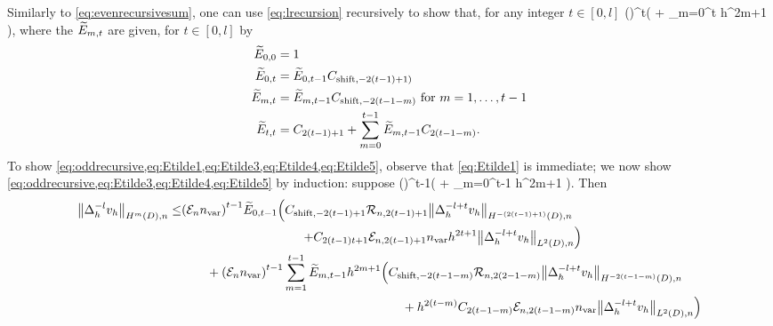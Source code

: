 Similarly to \cref{eq:evenrecursivesum}, one can use \cref{eq:lrecursion} recursively to show that, for any integer $t \in [0,l]$
\beq\label{eq:oddrecursive}
 \leq \mleft(\En \nvar\mright)^t\mleft(  + \sum_{m=0}^t  h^{2m+1}  \mright),
\eeq
where  the $\widetilde{E}_{m,t}$ are given, for $t \in [0,l]$ by
\begin{align}
\label{eq:Etilde1}\widetilde{E}_{0,0} &= 1\\
\label{eq:Etilde3}\widetilde{E}_{0,t} &= \widetilde{E}_{0,t-1}C_{\mathrm{shift},-2(t-1)+1)}\\
\label{eq:Etilde4}\widetilde{E}_{m,t} &= \widetilde{E}_{m,t-1}C_{\mathrm{shift},-2(t-1-m)}\text{ for } m = 1,\ldots,t-1\\
\label{eq:Etilde5}\widetilde{E}_{t,t} &= C_{2(t-1)+1} + \sum_{m=0}^{t-1}\widetilde{E}_{m,t-1}C_{2(t-1-m)}.\\
\end{align}
To show \cref{eq:oddrecursive,eq:Etilde1,eq:Etilde3,eq:Etilde4,eq:Etilde5}, observe that \cref{eq:Etilde1} is immediate; we now show \cref{eq:oddrecursive,eq:Etilde3,eq:Etilde4,eq:Etilde5} by induction: suppose %
\beqs
{} \leq \mleft(\En \nvar\mright)^{t-1}\mleft(  + \sum_{m=0}^{t-1}  h^{2m+1}  \mright).
\eeqs
Then
\begin{align*}
\NHnfn{m}{D}{\Deltah^{-l}\vh} \leq& \mleft(\En \nvar\mright)^{t-1} \Etildefn{0,t-1} \mleft(\Cshiftfn{2(t-1)+1} \shiftn{2(t-1)+1}\NHnfn{-(2(t-1)+1)}{D}{\Deltah^{-l + t}\vh}\mright.\\
&\hphantom{\mleft(\En \nvar\mright)^{t-1} \Etildefn{0,t-1}}\quad\quad\mleft.+\Cfn{2(t-1)t+1} \errn{2(t-1)+1}\nvar h^{2t+1} \NLtDn{\Deltah^{-l + t}\vh}\mright)\\
&\quad\quad+ \mleft(\En \nvar\mright)^{t-1}\sum_{m=1}^{t-1} \Etildefn{m,t-1} h^{2m+1} \mleft(\Cshiftfn{2(t-1-m)} \shiftn{2(2-1-m)}\NHnfn{-2(t-1-m)}{D}{\Deltah^{-l + t}\vh}\mright.\\
&\mleft.\hphantom{\quad\quad+ \mleft(\En \nvar\mright)^{t-1}\sum_{m=1}^{t-1} \Etildefn{m,t-1} h^{2m+1}}\quad\quad+ h^{2(t-m)} \Cfn{2(t-1-m)}\errn{2(t-1-m)}\nvar \NLtDn{\Deltah^{-l + t}\vh}\mright)\\
\end{align*}
